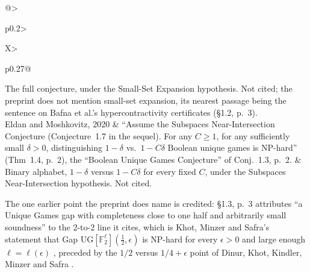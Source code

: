 \documentclass[11pt]{article}
\newcommand{\ploc}[2]{#1}
\newcommand{\sloc}[2]{\cite[#2]{#1}}
\begin{document}
\begin{center}
\begin{xltabular}{\linewidth}{@{}>{\raggedright\arraybackslash}p{0.2\linewidth}>{\raggedright\arraybackslash}X>{\raggedright\arraybackslash}p{0.27\linewidth}@{}}
The full conjecture, under the Small-Set Expansion hypothesis. Not cited; the preprint does not mention small-set expansion, its nearest passage being the sentence on Bafna et al.'s hypercontractivity certificates (\ploc{\S1.2, p.~3}{00-introduction.tex:103--108}).\\
\addlinespace
Eldan and Moshkovitz, 2020 \cite{EldanMoshkovitz2020-NonUniqueToBooleanUniqueGames} &
``Assume the Subspaces Near-Intersection Conjecture (Conjecture~1.7 in the sequel). For any $C\ge1$, for any sufficiently small $\delta>0$, distinguishing $1-\delta$ vs.\ $1-C\delta$ Boolean unique games is NP-hard'' (Thm~1.4, p.~2), the ``Boolean Unique Games Conjecture'' of Conj.~1.3, p.~2. &
Binary alphabet, $1-\delta$ versus $1-C\delta$ for every fixed $C$, under the Subspaces Near-Intersection hypothesis. Not cited.\\
\addlinespace
\bottomrule
\end{xltabular}
\end{center}
The one earlier point the preprint does name is credited:
\ploc{\S1.3, p.~3}{00-introduction.tex:129--131} attributes ``a Unique Games
gap with completeness close to one half and arbitrarily small soundness'' to
the 2-to-2 line it cites, which is Khot, Minzer and Safra's statement that
Gap UG$[\mathbb F_2^{\ell}](\tfrac12,\epsilon)$ is NP-hard for every
$\epsilon>0$ and large enough $\ell=\ell(\epsilon)$
\sloc{KhotMinzerSafra2018-PseudorandomGrassmannExpansion}{Thm~1.5, p.~6},
preceded by the $1/2$ versus $1/4+\epsilon$ point of Dinur, Khot, Kindler,
Minzer and Safra \sloc{DinurEtAl2018-Towards2to1}{Cor.~1.19, p.~15}.
\end{document}
